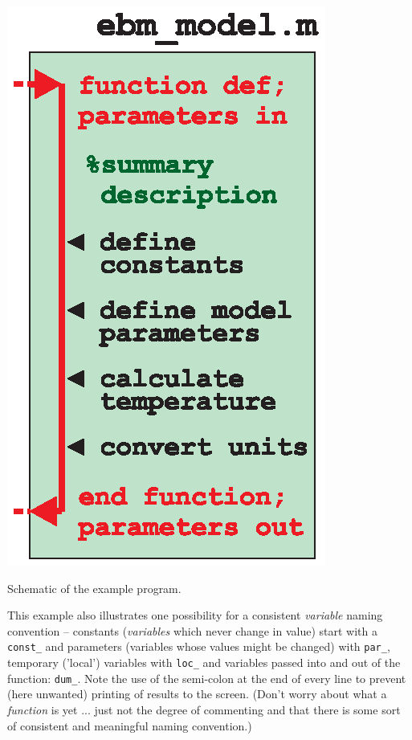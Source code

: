 \documentclass{tufte-book} %
\begin{document}
\begin{marginfigure}[0.0in]
\includegraphics[width=\linewidth]{ch2-example.eps}
\caption{Schematic of the example program.}
\label{fig:ch2-example}
\end{marginfigure}

This example also illustrates one possibility for a consistent \textit{variable} naming convention -- constants (\textit{variables} which never change in value) start with a \texttt{const\_} and parameters (variables whose values might be changed) with \texttt{par\_}, temporary ('local') variables with \texttt{loc\_} and variables passed into and out of the function: \texttt{dum\_}. Note the use of the semi-colon at the end of every line to prevent (here unwanted) printing of results to the screen. (Don't worry about what a \textit{function} is yet ... just not the degree of commenting and that there is some sort of consistent and meaningful naming convention.)
\end{document}
